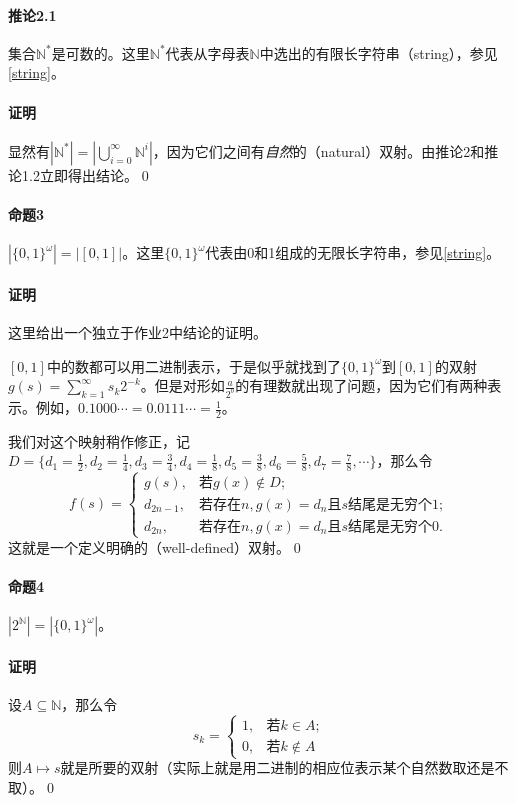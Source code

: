 \documentclass[b5paper,oneside]{ctexbook}
\begin{document}
\paragraph{推论2.1}集合$\mathbb{N}^*$是可数的。这里$\mathbb{N}^*$代表从字母表$\mathbb{N}$中选出的有限长字符串（string），参见\ref{string}。
\paragraph{证明}显然有$|\mathbb{N}^*|=|\bigcup\limits_{i=0}^\infty \mathbb{N}^i|$，因为它们之间有\textit{自然}的（natural）双射。由推论2和推论1.2立即得出结论。\hfill\qed
\paragraph{命题3}$|\{0,1\}^\omega |=|[0,1]|$。这里$\{0,1\}^\omega$代表由0和1组成的无限长字符串，参见\ref{string}。
\paragraph{证明}这里给出一个独立于作业2中结论的证明。

$[0,1]$中的数都可以用二进制表示，于是似乎就找到了$\{0,1\}^\omega$到$[0,1]$的双射$g(s)=\sum\limits_{k=1}^\infty s_k2^{-k}$。但是对形如$\frac{a}{2^b}$的有理数就出现了问题，因为它们有两种表示。例如，$0.1000\cdots =0.0111\cdots =\frac 12$。

我们对这个映射稍作修正，记$D=\{d_1=\frac 12,d_2=\frac 14,d_3=\frac 34,d_4=\frac 18,d_5=\frac 38,d_6=\frac 58,d_7=\frac 78,\cdots \}$，那么令
\[f(s)=\begin{cases}
g(s),&\text{若}g(x)\not\in D;
\\d_{2n-1},&\text{若存在}n, g(x)=d_n\text{且}s\text{结尾是无穷个1};
\\d_{2n},&\text{若存在}n, g(x)=d_n\text{且}s\text{结尾是无穷个0}.
\end{cases}\]
这就是一个定义明确的（well-defined）双射。\hfill\qed
\paragraph{命题4}$|2^\mathbb{N}|=|\{0,1\}^\omega |$。
\paragraph{证明}设$A\subseteq\mathbb{N}$，那么令
\[s_k=\begin{cases}1,&\text{若}k\in A;
\\0,&\text{若}k\not\in A\end{cases}\]
则$A\mapsto s$就是所要的双射（实际上就是用二进制的相应位表示某个自然数取还是不取）。\hfill\qed
\end{document}
